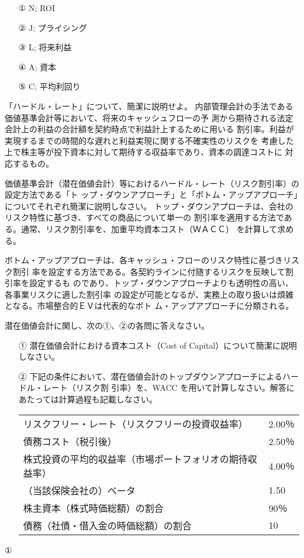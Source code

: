 \documentclass[report,gutter=10mm,fore-edge=10mm,uplatex,dvipdfmx]{jlreq}
\begin{document}
\answer{}
\begin{itemize}
\item[①] N; ROI
\item[②] J; プライシング
\item[③] L; 将来利益 
\item[④] A; 資本
\item[⑤] C; 平均利回り
\end{itemize}

「ハードル・レート」について、簡潔に説明せよ。
\answer{}
内部管理会計の手法である価値基準会計等において、将来のキャッシュフローの予
測から期待される法定会計上の利益の合計額を契約時点で利益計上するために用いる
割引率。利益が実現するまでの時間的な遅れと利益実現に関する不確実性のリスクを
考慮した上で株主等が投下資本に対して期待する収益率であり、資本の調達コストに
対応するもの。

価値基準会計（潜在価値会計）等におけるハードル・レート（リスク割引率）の設定方法である「ト
ップ・ダウンアプローチ」と「ボトム・アップアプローチ」についてそれぞれ簡潔に説明しなさい。
\answer{}
トップ・ダウンアプローチは、会社のリスク特性に基づき、すべての商品について単一の
割引率を適用する方法である。通常、リスク割引率を、加重平均資本コスト（ＷＡＣＣ）
を計算して求める。

ボトム・アップアプローチは、各キャッシュ・フローのリスク特性に基づきリスク割引
率を設定する方法である。各契約ラインに付随するリスクを反映して割引率を設定するも
のであり、トップ・ダウンアプローチよりも透明性の高い、各事業リスクに適した割引率
の設定が可能となるが、実務上の取り扱いは煩雑となる。市場整合的ＥＶは代表的なボト
ム・アップアプローチに分類される。

潜在価値会計に関し、次の①、②の各問に答えなさい。

\begin{itemize}
\item[①] 潜在価値会計における資本コスト（Cost of Capital）について簡潔に説明しなさい。
\item[②] 下記の条件において、潜在価値会計のトップダウンアプローチによるハードル・レート（リスク割 引率）を、WACC を用いて計算しなさい。解答にあたっては計算過程も記載しなさい。
\begin{tabular}{ll}
リスクフリー・レート（リスクフリーの投資収益率）&2.00％  \\
 債務コスト（税引後）&2.50％\\
 株式投資の平均的収益率（市場ポートフォリオの期待収益率） &4.00％\\
 （当該保険会社の）ベータ&1.50\\
 株主資本（株式時価総額）の割合&90％\\
 債務（社債・借入金の時価総額）の割合&10%
\end{tabular} 
\end{itemize}
\answer{}
①
\end{document}
